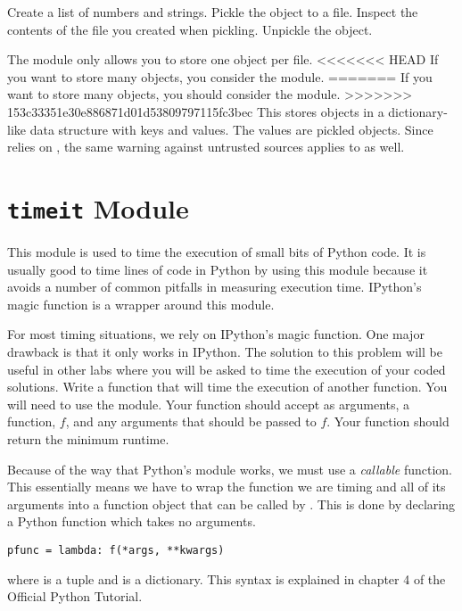 \begin{problem}
Create a list of numbers and strings.
Pickle the object to a file.
Inspect the contents of the file you created when pickling.
Unpickle the object.
\end{problem}

The  module only allows you to store one object per file.
<<<<<<< HEAD
If you want to store many objects, you consider the  module.
=======
If you want to store many objects, you should consider the  module.
>>>>>>> 153c33351e30e886871d01d53809797115fc3bec
This stores objects in a dictionary-like data structure with keys and values.
The values are pickled objects.
Since  relies on , the same warning against untrusted sources applies to  as well.

\section*{\texttt{timeit} Module}
This module is used to time the execution of small bits of Python code.
It is usually good to time lines of code in Python by using this module because it avoids a number of common pitfalls in measuring execution time.
IPython's  magic function is a wrapper around this module.

\begin{problem}
For most timing situations, we rely on IPython's  magic function.
One major drawback is that it only works in IPython.
The solution to this problem will be useful in other labs where you will be asked to time the execution of your coded solutions.
Write a function that will time the execution of another function.
You will need to use the  module.
Your function should accept as arguments, a function, $f$, and any arguments that should be passed to $f$.
Your function should return the minimum runtime.

Because of the way that Python's  module works, we must use a \emph{callable} function.
This essentially means we have to wrap the function we are timing and all of its arguments into a function object that can be called by .
This is done by declaring a Python  function which takes no arguments.
\begin{lstlisting}
pfunc = lambda: f(*args, **kwargs)
\end{lstlisting}
where  is a tuple and  is a dictionary.
This syntax is explained in chapter 4 of the Official Python Tutorial.
\end{problem}

